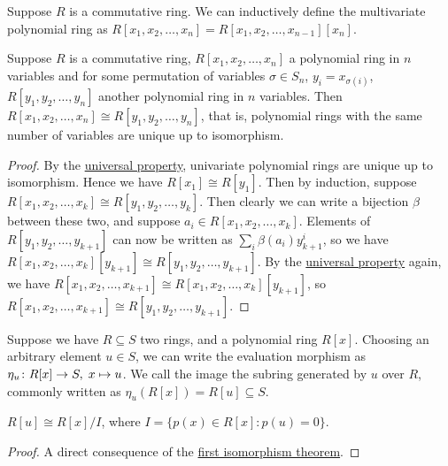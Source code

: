 \begin{definition}
    Suppose \(R\) is a commutative ring.
    We can inductively define the multivariate polynomial ring
    as \(R[x_1,x_2,\hdots,x_n] = R[x_1,x_2,\hdots,x_{n-1}][x_n]\).
\end{definition}
\begin{theorem}\label{thm:polynomial-ring-isomorphism}
    Suppose \(R\) is a commutative ring,
    \(R[x_1,x_2,\hdots,x_n]\) a polynomial ring in \(n\) variables
    and for some permutation of variables
    \(\sigma \in S_n\), \(y_i = x_{\sigma(i)}\),
    \(R[y_1,y_2,\hdots,y_n]\) another polynomial ring in \(n\) variables.
    Then \(R[x_1,x_2,\hdots,x_n] \cong R[y_1,y_2,\hdots,y_n]\),
    that is, polynomial rings with the same number of variables
    are unique up to isomorphism.
\end{theorem}
\begin{proof}
    By the \hyperref[thm:univ-prop-polynomial]{universal property},
    univariate polynomial rings are unique up to isomorphism.
    Hence we have \(R[x_1] \cong R[y_1]\).
    Then by induction,
    suppose \(R[x_1,x_2,\hdots,x_k] \cong R[y_1,y_2,\hdots,y_k]\).
    Then clearly we can write a bijection \(\beta\) between these two,
    and suppose \(a_i \in R[x_1,x_2,\hdots,x_k]\).
    Elements of \(R[y_1,y_2,\hdots,y_{k+1}]\)
    can now be written as \(\sum_i \beta(a_i) y_{k+1}^i\),
    so we have \(R[x_1,x_2,\hdots,x_k][y_{k+1}] \cong R[y_1,y_2,\hdots,y_{k+1}]\).
    By the \hyperref[thm:univ-prop-polynomial]{universal property} again, we have
    \(R[x_1,x_2,\hdots,x_{k+1}] \cong R[x_1,x_2,\hdots,x_k][y_{k+1}]\),
    so \(R[x_1,x_2,\hdots,x_{k+1}] \cong R[y_1,y_2,\hdots,y_{k+1}]\).
\end{proof}

\begin{definition}
    Suppose we have \(R \subseteq S\) two rings,
    and a polynomial ring \(R[x]\).
    Choosing an arbitrary element \(u \in S\),
    we can write the evaluation morphism as
    \(\eta_u\colon R[x]\to S,\;x\mapsto u\).
    We call the image the subring generated by \(u\) over \(R\),
    commonly written as \(\eta_u(R[x]) = R[u] \subseteq S\).
\end{definition}
\begin{proposition}
    \(R[u] \cong R[x]/I\), where \(I = \{p(x) \in R[x] : p(u) = 0\}\).
\end{proposition}
\begin{proof}
    A direct consequence of
    the \hyperref[thm:iso-1-ring]{first isomorphism theorem}.
\end{proof}

